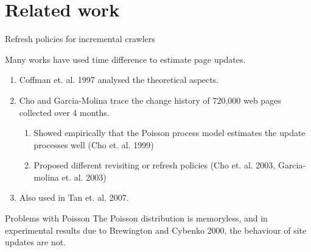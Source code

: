 \documentclass[compress]{beamer}
\begin{document}



\section{Related work}

\begin{frame}{Refresh policies for incremental crawlers}

Many works have used time difference to estimate page updates.
	\begin{enumerate}
		\item Coffman et. al. 1997 analysed the theoretical aspects.
		\item Cho and Garcia-Molina trace the change history of 720,000 web pages collected over 4 months.
		\begin{enumerate}		
			\item Showed empirically that the Poisson process model estimates the update processes well (Cho et. al. 1999)
			\item Proposed different revisiting or refresh policies (Cho et. al. 2003, Garcia-molina et. al. 2003)
		\end{enumerate}
		\item Also used in Tan et. al. 2007. %
	\end{enumerate}
\end{frame}

\begin{frame}{Problems with Poisson}
	The Poisson distribution is memoryless, and in experimental results due to Brewington and Cybenko 2000, the behaviour of site updates are not. 
\end{frame}
\end{document}
